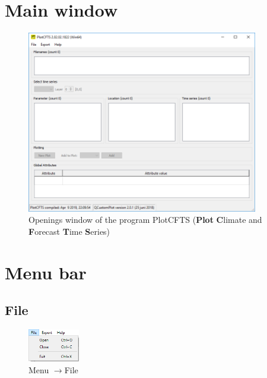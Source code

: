 \documentclass{deltares_memo}
\newcommand{\menuarrow}{$\rightarrow$}
\begin{document}
%
\newpage
\section{Main window}
\phantom{m}\vspace{-\baselineskip}
\begin{figure}[H]
    \centering    
        \includegraphics[width=0.9\textwidth]{pictures/main.png}
    \caption{Openings window of the program PlotCFTS (\textbf{Plot} \textbf{C}limate and \textbf{F}orecast \textbf{T}ime \textbf{S}eries)}
\end{figure}

\section{Menu bar}

\subsection{File}
\phantom{m}\vspace{-\baselineskip}
\begin{figure}[H]
    \centering    
    \includegraphics[width=0.20\textwidth]{pictures/menu_file.png}
    \caption{Menu \menuarrow File}
\end{figure}
\end{document}

